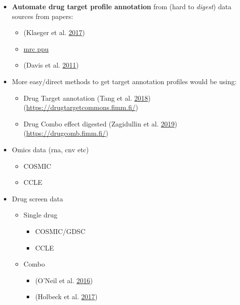 \documentclass[
  12pt,
]{book}
\providecommand{\tightlist}{%
  \setlength{\itemsep}{0pt}\setlength{\parskip}{0pt}}
\begin{document}
\begin{itemize}
\tightlist
\item
  \textbf{Automate drug target profile annotation} from (hard to \emph{digest}) data sources from papers:

  \begin{itemize}
  \tightlist
  \item
    (Klaeger et al. \protect\hyperlink{ref-Klaeger2017}{2017})
  \item
    \href{http://www.kinase-screen.mrc.ac.uk/}{mrc ppu}
  \item
    (Davis et al. \protect\hyperlink{ref-Davis2011}{2011})
  \end{itemize}
\item
  More easy/direct methods to get target annotation profiles would be using:

  \begin{itemize}
  \tightlist
  \item
    Drug Target annotation (Tang et al. \protect\hyperlink{ref-Tang2018}{2018}) (\url{https://drugtargetcommons.fimm.fi/})
  \item
    Drug Combo effect digested (Zagidullin et al. \protect\hyperlink{ref-Zagidullin2019}{2019}) (\url{https://drugcomb.fimm.fi/})
  \end{itemize}
\item
  Omics data (rna, cnv etc)

  \begin{itemize}
  \tightlist
  \item
    COSMIC
  \item
    CCLE
  \end{itemize}
\item
  Drug screen data

  \begin{itemize}
  \tightlist
  \item
    Single drug

    \begin{itemize}
    \tightlist
    \item
      COSMIC/GDSC
    \item
      CCLE
    \end{itemize}
  \item
    Combo

    \begin{itemize}
    \tightlist
    \item
      (O'Neil et al. \protect\hyperlink{ref-ONeil2016}{2016})
    \item
      (Holbeck et al. \protect\hyperlink{ref-Holbeck2017}{2017})
    \end{itemize}
  \end{itemize}
\end{itemize}
\end{document}
